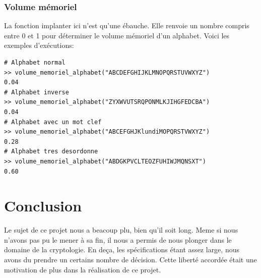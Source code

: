 \documentclass[a4paper, 11pt]{article}
\begin{document}
\subsubsection{Volume mémoriel}
La fonction implanter ici n'est qu'une ébauche. Elle renvoie un nombre
compris entre 0 et 1 pour déterminer le volume mémoriel d'un
alphabet. Voici les exemples d'exécutions:\\

\begin{lstlisting}
# Alphabet normal
>> volume_memoriel_alphabet("ABCDEFGHIJKLMNOPQRSTUVWXYZ")
0.04
# Alphabet inverse
>> volume_memoriel_alphabet("ZYXWVUTSRQPONMLKJIHGFEDCBA")
0.04
# Alphabet avec un mot clef
>> volume_memoriel_alphabet("ABCEFGHJKlundiMOPQRSTVWXYZ")
0.28
# Alphabet tres desordonne
>> volume_memoriel_alphabet("ABDGKPVCLTEOZFUHIWJMQNSXT") 
0.60  
\end{lstlisting}

\section{Conclusion}
Le sujet de ce projet nous a beacoup plu, bien qu'il soit long.
Meme si nous n'avons pas pu le mener à sa fin, il nous a permis de nous
plonger dans le domaine de la cryptologie.
En deça, les spécifications étant assez large, nous avons du prendre
un certains nombre de décision. Cette liberté accordée était une motivation de plus dans la
réalisation de ce projet.
\end{document}
